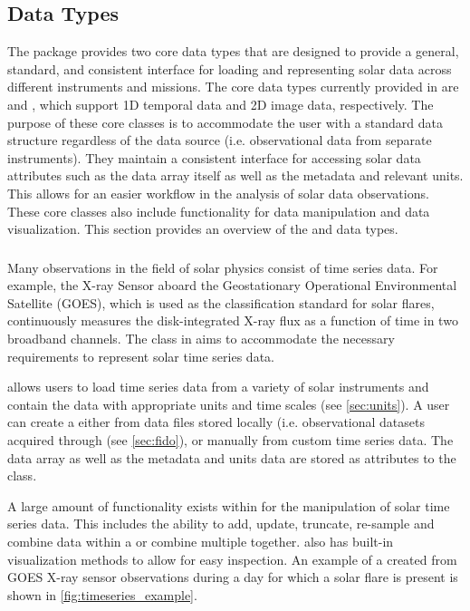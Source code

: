 \subsection{Data Types}
\label{sec:data_types}

The \sunpypkg package provides two core data types that are designed to provide a general, standard, and consistent interface for loading and representing solar data across different instruments and missions.
The core data types currently provided in \sunpypkg are \Timeseries and \Map, which support 1D temporal data and 2D image data, respectively. 
The purpose of these core classes is to accommodate the user with a standard data structure regardless of the data source (i.e. observational data from separate instruments). 
They maintain a consistent interface for accessing solar data attributes such as the data array itself as well as the metadata and relevant units. 
This allows for an easier workflow in the analysis of solar data observations.
These core classes also include functionality for data manipulation and data visualization. 
This section provides an overview of the \Timeseries and \Map data types.

\subsubsection{\Timeseries}
\label{sec:timeseries}
Many observations in the field of solar physics consist of time series data. 
For example, the X-ray Sensor aboard the Geostationary Operational Environmental Satellite (GOES), which is used as the classification standard for solar flares, continuously measures the disk-integrated X-ray flux as a function of time in two broadband channels. 
The \Timeseries class in \sunpypkg aims to accommodate the necessary requirements to represent solar time series data.

\Timeseries allows users to load time series data from a variety of solar instruments and contain the data with appropriate units and time scales (see \autoref{sec:units}). 
 A user can create a \Timeseries either from data files stored locally (i.e. observational datasets acquired through \Fido (see \autoref{sec:fido}), or manually from custom time series data. 
 The data array as well as the metadata and units data are stored as attributes to the \Timeseries class. 

A large amount of functionality exists within \Timeseries for the manipulation of solar time series data.
This includes the ability to add, update, truncate, re-sample and combine data within a \Timeseries or combine multiple \Timeseries together. 
\Timeseries also has built-in visualization methods to allow for easy inspection. 
An example of a \Timeseries created from GOES X-ray sensor observations during a day for which a solar flare is present is shown in \autoref{fig:timeseries_example}.

